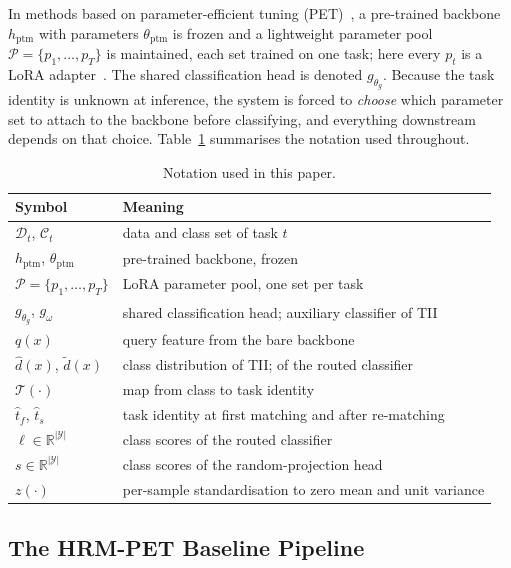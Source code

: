 \documentclass[runningheads]{llncs}
\begin{document}
In methods based on parameter-efficient tuning
(PET)~\cite{ref_l2p,ref_dualprompt,ref_hide}, a pre-trained backbone
$h_{\mathrm{ptm}}$ with parameters $\theta_{\mathrm{ptm}}$ is frozen and a
lightweight parameter pool $\mathcal{P}=\{p_1,\dots,p_T\}$ is maintained, each
set trained on one task; here every $p_t$ is a LoRA adapter~\cite{ref_lora}. The
shared classification head is denoted $g_{\theta_g}$. Because the task identity
is unknown at inference, the system is forced to \emph{choose} which parameter
set to attach to the backbone before classifying, and everything downstream
depends on that choice. Table~\ref{tab:notation} summarises the notation used
throughout.

\begin{table}
\caption{Notation used in this paper.}\label{tab:notation}
\begin{tabular}{ll}
\hline
Symbol & Meaning\\
\hline
$\mathcal{D}_t$, $\mathcal{C}_t$ & data and class set of task $t$\\
$h_{\mathrm{ptm}}$, $\theta_{\mathrm{ptm}}$ & pre-trained backbone, frozen\\
$\mathcal{P}=\{p_1,\dots,p_T\}$ & LoRA parameter pool, one set per task\\
$g_{\theta_g}$, $g_\omega$ & shared classification head; auxiliary classifier of TII\\
$q(x)$ & query feature from the bare backbone\\
$\hat{d}(x)$, $\tilde{d}(x)$ & class distribution of TII; of the routed classifier\\
$\mathcal{T}(\cdot)$ & map from class to task identity\\
$\hat{t}_f$, $\hat{t}_s$ & task identity at first matching and after re-matching\\
$\ell \in \mathbb{R}^{|\mathcal{Y}|}$ & class scores of the routed classifier\\
$s \in \mathbb{R}^{|\mathcal{Y}|}$ & class scores of the random-projection head\\
$z(\cdot)$ & per-sample standardisation to zero mean and unit variance\\
\hline
\end{tabular}
\end{table}

\subsection{The HRM-PET Baseline Pipeline}
\end{document}
